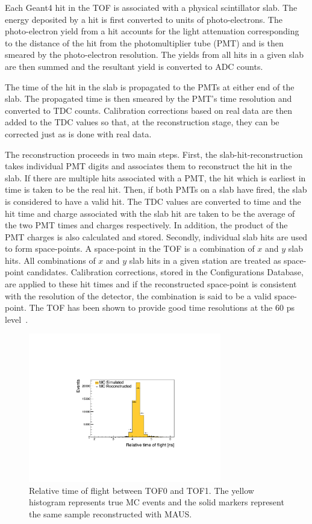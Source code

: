 \documentclass[11pt,a4paper]{article}
\begin{document}
Each Geant4 hit in the TOF is associated with a physical scintillator slab. The energy deposited by a hit is first converted to units of photo-electrons. The photo-electron yield from a hit accounts for the light attenuation corresponding to the distance of the hit from the photomultiplier tube (PMT) and is then smeared by the photo-electron resolution. The yields from all hits in a given slab are then summed and the resultant yield is converted to ADC counts.

The time of the hit in the slab is propagated to the PMTs at either end of the slab. The propagated time is then smeared by the PMT's time resolution and converted to TDC counts. Calibration corrections based on real data are then added to the TDC values so that, at the reconstruction stage, they can be corrected just as is done with real data.

The reconstruction proceeds in two main steps. First, the slab-hit-reconstruction takes individual PMT digits and associates them to reconstruct the hit in the slab. If there are multiple hits associated with a PMT, the hit which is earliest in time is taken to be the real hit. Then, if both PMTs on a slab have fired, the slab is considered to have a valid hit. The TDC values are converted to time and the hit time and charge associated with the slab hit are taken to be the average of the two PMT times and charges respectively. In addition, the product of the PMT charges is also calculated and stored. Secondly, individual slab hits are used to form space-points. A space-point  in the TOF is a combination of $x$ and $y$ slab hits. All combinations of $x$ and $y$ slab hits in a given station are treated as space-point candidates. Calibration corrections, stored in the Configurations Database, are applied to these hit times and if the reconstructed space-point is consistent with the resolution of the detector, the combination is said to be a valid space-point. The TOF has been shown to provide good time resolutions at the 60 ps level~\cite{NIMA_TOF}.

\begin{figure}[htbp]
  \centering
    \includegraphics[width=0.75\textwidth]{figs/fig-tof01-t.pdf}
  \caption{Relative time of flight between TOF0 and TOF1. The yellow histogram represents true MC events and the solid markers represent the same sample reconstructed with MAUS.}
  \label{fig:tof01t}
\end{figure}
\end{document}
